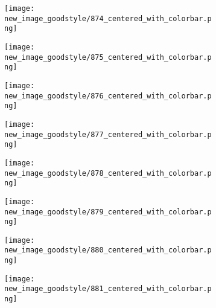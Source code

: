 \documentclass[a4paper,12pt]{article}
\begin{document}
\begin{figure}[H]
  \begin{subfigure}{0.11\textwidth}
    \texttt{[image: new\_image\_goodstyle/874\_centered\_with\_colorbar.png]}
  \end{subfigure}
  \hfill
  \begin{subfigure}{0.11\textwidth}
    \texttt{[image: new\_image\_goodstyle/875\_centered\_with\_colorbar.png]}
  \end{subfigure}
  \hfill
  \begin{subfigure}{0.11\textwidth}
    \texttt{[image: new\_image\_goodstyle/876\_centered\_with\_colorbar.png]}
  \end{subfigure}
  \hfill
  \begin{subfigure}{0.11\textwidth}
    \texttt{[image: new\_image\_goodstyle/877\_centered\_with\_colorbar.png]}
  \end{subfigure}
  \hfill
  \begin{subfigure}{0.11\textwidth}
    \texttt{[image: new\_image\_goodstyle/878\_centered\_with\_colorbar.png]}
  \end{subfigure}
  \hfill
  \begin{subfigure}{0.11\textwidth}
    \texttt{[image: new\_image\_goodstyle/879\_centered\_with\_colorbar.png]}
  \end{subfigure}
  \hfill
  \begin{subfigure}{0.11\textwidth}
    \texttt{[image: new\_image\_goodstyle/880\_centered\_with\_colorbar.png]}
  \end{subfigure}
  \hfill
  \begin{subfigure}{0.11\textwidth}
    \texttt{[image: new\_image\_goodstyle/881\_centered\_with\_colorbar.png]}
  \end{subfigure}
  \hfill
\end{figure}
\end{document}
